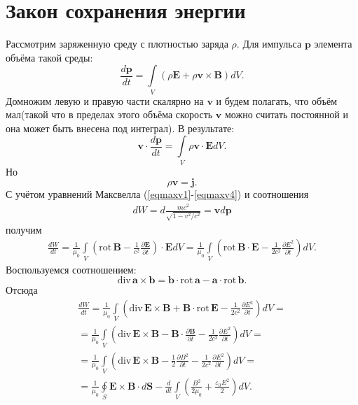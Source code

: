 \documentclass[a4paper,14pt]{extreport} %
\newcommand{\dff}[2]{\frac{\partial #1}{\partial #2}}
\newcommand{\Df}[1]{\frac{d}{d #1}}
\newcommand{\Dff}[2]{\frac{d #1}{d #2}}
\renewcommand{\vec}[1]{\boldsymbol{#1}}
\renewcommand{\div}{\mathrm{div}\,}
\newcommand{\rot}{\mathrm{rot}\,}
\newcommand{\eps}{\varepsilon}
\begin{document}
	\section{Закон сохранения энергии}
	
	Рассмотрим заряженную среду с плотностью заряда $\rho$. Для импульса $\vec{p}$ элемента объёма такой среды:
	\begin{equation*}
		\Dff{\vec{p}}{t} = \int\limits_{V} (\rho \vec{E} + \rho \vec{v}\times\vec{B} ) dV.
	\end{equation*}
	Домножим левую и правую части скалярно на $\vec{v}$ и будем полагать, что объём мал(такой что в пределах этого объёма скорость $\vec{v}$ можно считать постоянной и она может быть внесена под интеграл). В результате:
	\begin{equation*}
		\vec{v}\cdot\Dff{\vec{p}}{t} = \int\limits_{V} \rho \vec{v}\cdot\vec{E} dV.
	\end{equation*}
	Но
	\begin{equation*}
		\rho \vec{v} = \vec{j}.
	\end{equation*}
	С учётом уравнений Максвелла (\ref{eqmaxv1}-\ref{eqmaxv4}) и соотношения
	\begin{gather*}
		dW = d \frac{mc^2}{\sqrt{1 - v^2/c^2}} = \vec{v} d \vec{p}
	\end{gather*}
	получим 
	\begin{gather*}
		\Dff{W}{t} = 
		\frac{1}{\mu_0} \int\limits_{V} \left( \rot \vec{B} - \frac{1}{c^2} \dff{\vec{E}}{t} \right) \cdot \vec{E}dV =
		\frac{1}{\mu_0} \int\limits_{V} \left( \rot \vec{B} \cdot \vec{E} - \frac{1}{2 c^2} \dff{E^2}{t} \right) dV.
	\end{gather*}
	Воспользуемся соотношением:
	\begin{equation*}
		\div \vec{a}\times\vec{b} = \vec{b}\cdot \rot \vec{a} - \vec{a}\cdot \rot \vec{b}.
	\end{equation*}
	Отсюда
	\begin{gather*}
		\Dff{W}{t} = 
		\frac{1}{\mu_0} \int\limits_{V} \left( \div \vec{E}\times\vec{B} + \vec{B}\cdot \rot \vec{E} - \frac{1}{2 c^2} \dff{E^2}{t} \right) dV = \\
		= 
		\frac{1}{\mu_0} \int\limits_{V} \left( \div \vec{E}\times\vec{B} - \vec{B}\cdot\dff{\vec{B}}{t}  - \frac{1}{2 c^2} \dff{E^2}{t} \right) dV = \\ 
		=
		\frac{1}{\mu_0} \int\limits_{V} \left( \div \vec{E}\times\vec{B} - \frac{1}{2}\dff{B^2}{t}  - \frac{1}{2 c^2} \dff{E^2}{t} \right) dV = \\
		=
		\frac{1}{\mu_0} \oint\limits_{S} \vec{E}\times\vec{B}\cdot d\vec{S} -
		\Df{t} \int\limits_{V} \left( \frac{B^2}{2\mu_0} + \frac{\eps_0 E^2}{2}\right) dV.
	\end{gather*}
\end{document}
